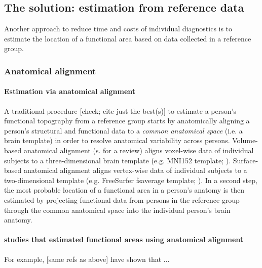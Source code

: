 \subsection{The solution: estimation from reference data}

Another approach to reduce time and costs of individual diagnostics is to
estimate the location of a functional area based on data collected in a
reference group.


\subsubsection{Anatomical alignment}


\paragraph{Estimation via anatomical alignment}
%
A traditional procedure \citep{frost2012measuring, weiner2018defining,
zhen2017quantifying, zhen2015quantifying, rosenke2021probabilistic,
wang2015probabilistic} [check; cite just the best(s)] to estimate a person's
functional topography from a reference group starts by anatomically aligning a
person's structural and functional data to a \textit{common anatomical space}
(i.e. a brain template) in order to resolve anatomical variability across
persons.
Volume-based anatomical alignment (s. \citep{klein2009evaluation} for a review)
aligns voxel-wise data of individual subjects to a three-dimensional brain
template (e.g. MNI152 template; \citep{fonov2011unbiased}).
Surface-based anatomical alignment \citep{fischl1999cortical} aligns vertex-wise
data of individual subjects to a two-dimensional template (e.g. FreeSurfer
fsaverage template; \citep{fischl1999high}).
In a second step, the most probable location of a functional area in a person's
anatomy is then estimated by projecting functional data from persons in the
reference group through the common anatomical space into the individual person's
brain anatomy.


\paragraph{studies that estimated functional areas using anatomical alignment}


For example,  \citep{frost2012measuring, weiner2018defining,
zhen2017quantifying, zhen2015quantifying, rosenke2021probabilistic,
wang2015probabilistic} [same refs as above] have shown that ...

